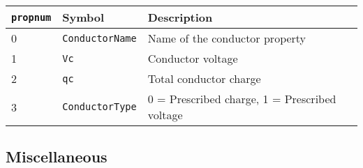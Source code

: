 \begin{itemize}
\begin{tabular}{lll}
\texttt{propnum} & Symbol & Description \\ \hline
  0 & \texttt{ConductorName} & Name of the conductor property \\
  1 & \texttt{Vc} &  Conductor voltage \\
  2 & \texttt{qc} &  Total conductor charge \\
  3 & \texttt{ConductorType} & 0 = Prescribed charge, 1 = Prescribed voltage
\end{tabular}

\end{itemize}

\subsection{Miscellaneous}


